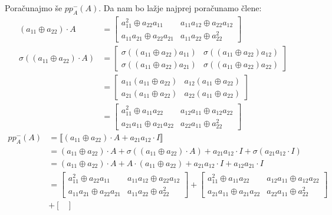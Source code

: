 \documentclass[mat1]{fmfdelo}
\begin{document}
\begin{zgled}
Poračunajmo še $pp_A^{-}(A)$. Da nam bo lažje najprej poračunamo člene:
\begin{align*}
	(a_{11} \oplus a_{22})\cdot A &= \begin{bmatrix}
		a_{11}^2 \oplus a_{22}a_{11} & a_{11}a_{12} \oplus a_{22}a_{12} \\
		a_{11}a_{21} \oplus a_{22}a_{21} & a_{11}a_{22} \oplus a_{22}^2
	\end{bmatrix} \\
\sigma((a_{11} \oplus a_{22})\cdot A) &= \begin{bmatrix}
	\sigma((a_{11} \oplus a_{22})a_{11}) & \sigma((a_{11} \oplus a_{22})a_{12}) \\
	\sigma((a_{11} \oplus a_{22})a_{21}) & \sigma((a_{11} \oplus a_{22})a_{22})
\end{bmatrix} \\ &= \begin{bmatrix}
	a_{11}(a_{11} \oplus a_{22}) & a_{12}(a_{11} \oplus a_{22}) \\
	a_{21}(a_{11} \oplus a_{22}) & a_{22}(a_{11} \oplus a_{22})
\end{bmatrix} \\ &= \begin{bmatrix}
	a_{11}^2 \oplus a_{11}a_{22} & a_{12}a_{11} \oplus a_{12}a_{22} \\
	a_{21}a_{11} \oplus a_{21}a_{22} & a_{22}a_{11} \oplus a_{22}^2
\end{bmatrix}
\end{align*}
\begin{align*}
	pp_A^{-}(A) &= \llbracket (a_{11} \oplus a_{22})\cdot A + a_{21}a_{12}\cdot I \rrbracket \\ &= (a_{11} \oplus a_{22})\cdot A + \sigma((a_{11} \oplus a_{22})\cdot A) + a_{21}a_{12}\cdot I + \sigma(a_{21}a_{12}\cdot I) \\
	&= (a_{11} \oplus a_{22})\cdot A + A\cdot (a_{11} \oplus a_{22}) + a_{21}a_{12}\cdot I + a_{12}a_{21}\cdot I \\ &= \begin{bmatrix}
	a_{11}^2 \oplus a_{22}a_{11} & a_{11}a_{12} \oplus a_{22}a_{12} \\
	a_{11}a_{21} \oplus a_{22}a_{21} & a_{11}a_{22} \oplus a_{22}^2
\end{bmatrix} + \begin{bmatrix}
a_{11}^2 \oplus a_{11}a_{22} & a_{12}a_{11} \oplus a_{12}a_{22} \\
a_{21}a_{11} \oplus a_{21}a_{22} & a_{22}a_{11} \oplus a_{22}^2
\end{bmatrix}\\ &+ \begin{bmatrix}

\end{bmatrix}
\end{align*}
\end{zgled}
\end{document}
